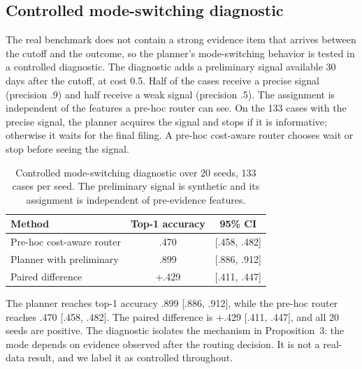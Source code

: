 \documentclass[11pt]{article}
\begin{document}
\subsection{Controlled mode-switching diagnostic}
\label{app:controlled}
The real benchmark does not contain a strong evidence item that arrives between the cutoff and the outcome, so the planner's mode-switching behavior is tested in a controlled diagnostic. The diagnostic adds a preliminary signal available 30 days after the cutoff, at cost 0.5. Half of the cases receive a precise signal (precision .9) and half receive a weak signal (precision .5). The assignment is independent of the features a pre-hoc router can see. On the 133 cases with the precise signal, the planner acquires the signal and stops if it is informative; otherwise it waits for the final filing. A pre-hoc cost-aware router chooses wait or stop before seeing the signal.

\begin{table}[t]
\centering
\small
\setlength{\tabcolsep}{4pt}
\begin{tabular}{lcc}
\toprule
Method & Top-1 accuracy & 95\% CI \\
\midrule
Pre-hoc cost-aware router & .470 & [.458, .482] \\
Planner with preliminary & .899 & [.886, .912] \\
Paired difference & +.429 & [.411, .447] \\
\bottomrule
\end{tabular}
\caption{Controlled mode-switching diagnostic over 20 seeds, 133 cases per seed. The preliminary signal is synthetic and its assignment is independent of pre-evidence features.}
\label{tab:controlled}
\end{table}

The planner reaches top-1 accuracy .899 [.886, .912], while the pre-hoc router reaches .470 [.458, .482]. The paired difference is +.429 [.411, .447], and all 20 seeds are positive. The diagnostic isolates the mechanism in Proposition~3: the mode depends on evidence observed after the routing decision. It is not a real-data result, and we label it as controlled throughout.
\end{document}
